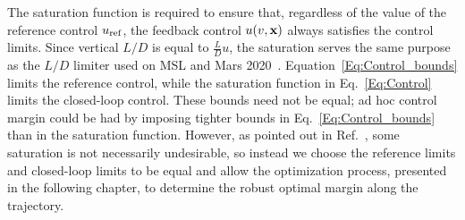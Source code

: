The saturation function is required to ensure that, regardless of the value of the reference control $ u_{\mathrm{ref}} $, the feedback control $u(v,\mathbf{x})$ always satisfies the control limits. Since vertical $L/D$ is equal to $\frac{L}{D}u$, the saturation serves the same purpose as the $L/D$ limiter used on MSL and Mars 2020~\cite{MSL_EDL2}. Equation~\eqref{Eq:Control_bounds} limits the reference control, while the saturation function in Eq.~\eqref{Eq:Control} limits the closed-loop control. These bounds need not be equal; ad hoc control margin could be had by imposing tighter bounds in Eq.~\eqref{Eq:Control_bounds} than in the saturation function. However, as pointed out in Ref.~\cite{MSL_EDL2}, some saturation is not necessarily undesirable, so instead we choose the reference limits and closed-loop limits to be equal and allow the optimization process, presented in the following chapter, to determine the robust optimal margin along the trajectory.

